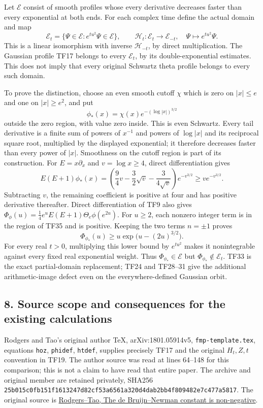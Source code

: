 \documentclass[
  10pt,
  a4paper,
]{article}
\begin{document}
Let \(\mathscr E\) consist of smooth profiles whose every derivative
decreases faster than every exponential at both ends. For each complex
time define the actual domain and map \[
\mathscr E_t=\{\Psi\in\mathscr E:e^{tu^2}\Psi\in\mathscr E\},
\qquad \mathscr H_t:\mathscr E_t\longrightarrow\mathscr E_{-t},
\quad\Psi\longmapsto e^{tu^2}\Psi.
\tag{TF33}
\] This is a linear isomorphism with inverse \(\mathscr H_{-t}\), by
direct multiplication. The Gaussian profile TF17 belongs to every
\(\mathscr E_t\), by its double-exponential estimates. This does not
imply that every original Schwartz theta profile belongs to every such
domain.

To prove the distinction, choose an even smooth cutoff \(\chi\) which is
zero on \(|x|\le e\) and one on \(|x|\ge e^2\), and put \[
\phi_*(x)=\chi(x)e^{-(\log|x|)^{3/2}}
\tag{TF34}
\] outside the zero region, with value zero inside. This is even
Schwartz. Every tail derivative is a finite sum of powers of \(x^{-1}\)
and powers of \(\log|x|\) and its reciprocal square root, multiplied by
the displayed exponential; it therefore decreases faster than every
power of \(|x|\). Smoothness on the cutoff region is part of its
construction. For \(E=x\partial_x\) and \(v=\log x\ge4\), direct
differentiation gives \[
E(E+1)\phi_*(x)=
\left(\frac94v-\frac32\sqrt v-\frac3{4\sqrt v}\right)e^{-v^{3/2}}
\ge v e^{-v^{3/2}}.
\tag{TF35}
\] Subtracting \(v\), the remaining coefficient is positive at four and
has positive derivative thereafter. Direct differentiation of TF9 also
gives \(\Phi_\phi(u)=\frac14e^u E(E+1)\Theta_e\phi(e^{2u})\). For
\(u\ge2\), each nonzero integer term is in the region of TF35 and is
positive. Keeping the two terms \(n=\pm1\) proves \[
\Phi_{\phi_*}(u)\ge u\exp\big(u-(2u)^{3/2}\big).
\tag{TF36}
\] For every real \(t>0\), multiplying this lower bound by \(e^{tu^2}\)
makes it nonintegrable against every fixed real exponential weight. Thus
\(\Phi_{\phi_*}\in\mathscr E\) but \(\Phi_{\phi_*}\notin\mathscr E_t\).
TF33 is the exact partial-domain replacement; TF24 and TF28--31 give the
additional arithmetic-image defect even on the everywhere-defined
Gaussian orbit.

\subsection{8. Source scope and consequences for the existing
calculations}\label{source-scope-and-consequences-for-the-existing-calculations}

Rodgers and Tao's original author TeX, arXiv:1801.05914v5,
\texttt{fmp-\allowbreak{}template.\allowbreak{}tex}, equations \texttt{hoz}, \texttt{phidef},
\texttt{htdef}, supplies precisely TF17 and the original \(H_t,Z,t\)
convention in TF19. The author source was read at lines 64--148 for this
comparison; this is not a claim to have read that entire paper. The
archive and original member are retained privately, SHA256
\texttt{25b015c0\allowbreak{}fb151f16\allowbreak{}13247d82\allowbreak{}cf53a656\allowbreak{}1a320d4d\allowbreak{}ab2bb4f8\allowbreak{}09482e7c\allowbreak{}477a5817}.
The original source is
\href{https://arxiv.org/abs/1801.05914v5}{Rodgers--Tao, The de
Bruijn--Newman constant is non-negative}.
\end{document}
